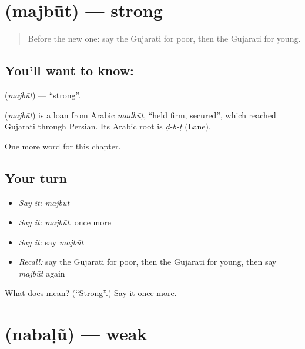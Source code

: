 \section[\texorpdfstring{\gu{મજબૂત} (majbūt)}{મજબૂત (majbūt)}]{ (majbūt) — strong}

\label{lesson:GU-C137-majbut}



\begin{quote}
Before the new one: say the Gujarati for poor, then the Gujarati for young.
\end{quote}

\subsection*{You'll want to know: }
\textbf{} (\emph{majbūt}) — \textquotedblleft{}strong\textquotedblright{}.

\begin{cousinweb}
\textbf{} (\emph{majbūt}) is a loan from Arabic \emph{maḍbūṭ}, \textquotedblleft{}held firm, secured\textquotedblright{}, which reached Gujarati through Persian. Its Arabic root is \emph{ḍ-b-ṭ} (Lane).
\end{cousinweb}

\begin{grammarlens}[title={What you've built}]
One more word for this chapter.
\end{grammarlens}

\subsection*{Your turn}
\begin{itemize}
\raggedright
  \item \emph{Say it:} \emph{majbūt}
  \item \emph{Say it:} \emph{majbūt}, once more
  \item \emph{Say it:} say \emph{majbūt}
  \item \emph{Recall:} say the Gujarati for poor, then the Gujarati for young, then say \emph{majbūt} again
\end{itemize}

\begin{tcolorbox}[breakable,colback=teal!4,colframe=teal!35!black,title={Before you move on}]
What does  mean? (\textquotedblleft{}Strong\textquotedblright{}.) Say it once more.
\end{tcolorbox}
\section[\texorpdfstring{\gu{નબળું} (nabaḷũ)}{નબળું (nabaḷũ)}]{ (nabaḷũ) — weak}

